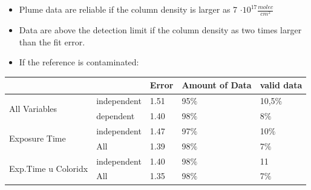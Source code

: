 \documentclass  [
  paper    = a4,
  BCOR     = 10mm,
  twoside,
  fontsize = 12pt,
  fleqn,
  toc      = bibnumbered,
  toc      = listofnumbered,
  numbers  = noendperiod,
  headings = normal,
  listof   = leveldown,
  version  = 3.03
]                                       {scrreprt}
\begin{document}
	\begin{itemize}
	
		\item Plume data are reliable if the  column density is larger as 7 $\cdot 10^{17} \frac{molec}{cm^2}$
		\item Data are above the detection limit if the column density as two times larger than the fit error.
		\item If the reference is contaminated:

	\end{itemize}
	\begin{figure}
		\centering
		\caption{}
		\label{fig:percentageminso2}
	\end{figure}
	\begin{figure}
		\centering
		\caption{}
		\label{fig:dataminso2}
	\end{figure}
			\begin{table}[h]
		\begin{tabular}{|p{2cm}|p{2.5cm}|p{1.5cm}|p{1.5cm}||p{1cm}|}
			&& Error & Amount of Data&valid data\\
			\toprule
			\multirow{2}{5em}{All Variables} 
			& independent& 1.51 & 95$\%$&10,5$\%$\\
			& dependent & 1.40&98$\%$ &8$\%$\\
			\midrule
			\multirow{2}{5em}{Exposure Time}
			&  independent &1.47&97$\%$&10$\%$\\
			& All &1.39&98$\%$&7$\%$\\
			\midrule
			\multirow{2}{5em}{Exp.Time u Coloridx}
			&  independent &1.40& 98$\%$&11\\
			& All & 1.35& 98$\%$&7$\%$\\
			\bottomrule
		\end{tabular}
	\end{table}
\end{document}
